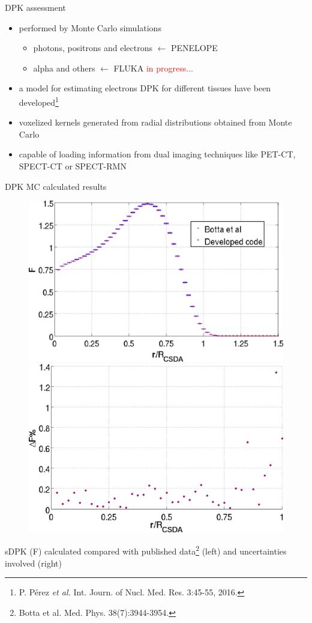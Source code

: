 \documentclass[ignorenonframetext,]{beamer}
\providecommand{\tightlist}{%
  \setlength{\itemsep}{0pt}\setlength{\parskip}{0pt}}
\begin{document}
\begin{frame}{DPK assessment}
\protect\hypertarget{dpk-assessment}{}

\begin{itemize}
\item
  performed by Monte Carlo simulations

  \begin{itemize}
  \tightlist
  \item
    photons, positrons and electrons \(\leftarrow\) PENELOPE
  \item
    alpha and others \(\leftarrow\) FLUKA
    \textcolor{red}{in progress...}
  \end{itemize}
\item
  a model for estimating electrons DPK for different tissues have been
  developed\footnote{P. Pérez {\it et al.} Int. Journ. of Nucl. Med. Res. 3:45-55, 2016.}
\item
  voxelized kernels generated from radial distributions obtained from
  Monte Carlo
\item
  capable of loading information from dual imaging techniques like
  PET-CT, SPECT-CT or SPECT-RMN
\end{itemize}

\end{frame}

\begin{frame}{DPK MC calculated results}
\protect\hypertarget{dpk-mc-calculated-results}{}

\begin{figure}
\centering
\includegraphics[height=.31\textwidth]{imgs/dpk_validation.png}
\includegraphics[height=.31\textwidth]{imgs/dpk_validation_err.png}
\end{figure}

sDPK (F) calculated compared with published
data\footnote{Botta et al. Med. Phys. 38(7):3944-3954.} (left) and
uncertainties involved (right)

\end{frame}
\end{document}
